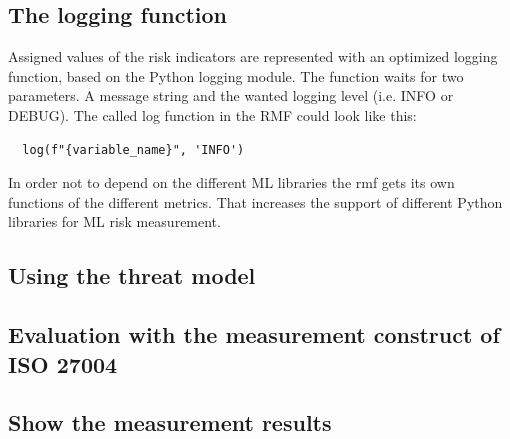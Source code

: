 \subsection{The logging function}

Assigned values of the risk indicators are represented with an optimized logging function, based on the Python logging module. The function waits for two parameters. A message string and the wanted logging level (i.e. INFO or DEBUG). The called log function in the RMF could look like this:
\begin{lstlisting}
  log(f"{variable_name}", 'INFO')
\end{lstlisting}

In order not to depend on the different ML libraries the rmf gets its own functions of the different metrics. That increases the support of different Python libraries for ML risk
measurement.

\subsection{Using the threat model}
\subsection{Evaluation with the measurement construct of ISO 27004}
\subsection{Show the measurement results}
